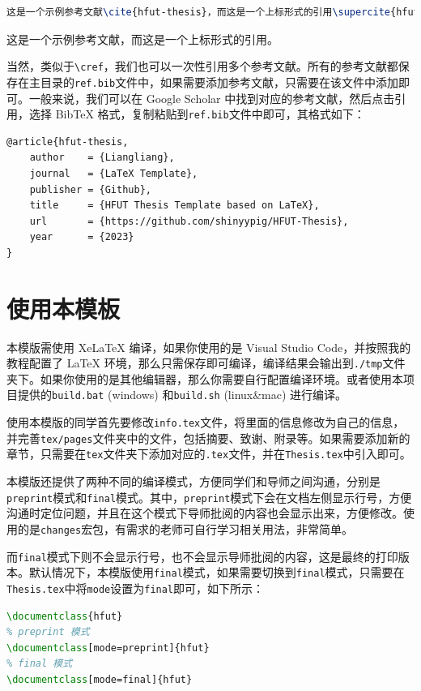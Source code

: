 \begin{lstlisting}[language=TeX]
这是一个示例参考文献\cite{hfut-thesis}，而这是一个上标形式的引用\supercite{hfut-thesis}。
\end{lstlisting}

这是一个示例参考文献\cite{hfut-thesis}，而这是一个上标形式的引用\supercite{hfut-thesis}。

当然，类似于\texttt{\textbackslash cref}，我们也可以一次性引用多个参考文献。所有的参考文献都保存在主目录的\texttt{ref.bib}文件中，如果需要添加参考文献，只需要在该文件中添加即可。一般来说，我们可以在 Google Scholar 中找到对应的参考文献，然后点击引用，选择 BibTeX 格式，复制粘贴到\texttt{ref.bib}文件中即可，其格式如下：

\begin{lstlisting}[language=TeX]
@article{hfut-thesis,
    author    = {Liangliang},
    journal   = {LaTeX Template},
    publisher = {Github},
    title     = {HFUT Thesis Template based on LaTeX},
    url       = {https://github.com/shinyypig/HFUT-Thesis},
    year      = {2023}
}
\end{lstlisting}

\section{使用本模板}

本模版需使用 XeLaTeX 编译，如果你使用的是 Visual Studio Code，并按照我的教程配置了 LaTeX 环境，那么只需保存即可编译，编译结果会输出到\texttt{./tmp}文件夹下。如果你使用的是其他编辑器，那么你需要自行配置编译环境。或者使用本项目提供的\texttt{build.bat} (windows) 和\texttt{build.sh} (linux\&mac) 进行编译。

使用本模版的同学首先要修改\texttt{info.tex}文件，将里面的信息修改为自己的信息，并完善\texttt{tex/pages}文件夹中的文件，包括摘要、致谢、附录等。如果需要添加新的章节，只需要在\texttt{tex}文件夹下添加对应的\texttt{.tex}文件，并在\texttt{Thesis.tex}中引入即可。

本模版还提供了两种不同的编译模式，方便同学们和导师之间沟通，分别是\texttt{preprint}模式和\texttt{final}模式。其中，\texttt{preprint}模式下会在文档左侧显示行号，方便沟通时定位问题，并且在这个模式下导师批阅的内容也会显示出来，方便修改。使用的是\texttt{changes}宏包，有需求的老师可自行学习相关用法，非常简单。

而\texttt{final}模式下则不会显示行号，也不会显示导师批阅的内容，这是最终的打印版本。默认情况下，本模版使用\texttt{final}模式，如果需要切换到\texttt{final}模式，只需要在\texttt{Thesis.tex}中将\texttt{mode}设置为\texttt{final}即可，如下所示：

\begin{lstlisting}[language=TeX]
% final 模式
\documentclass{hfut}
% preprint 模式
\documentclass[mode=preprint]{hfut}
% final 模式
\documentclass[mode=final]{hfut}
\end{lstlisting}